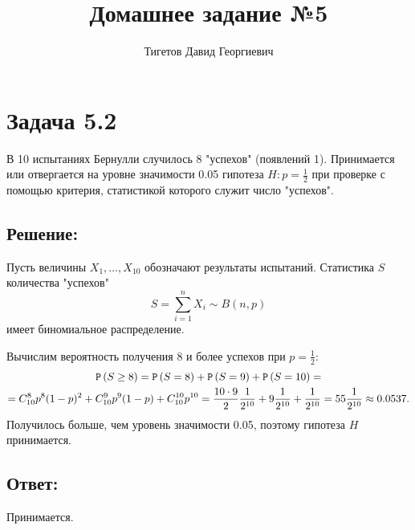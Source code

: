 \documentclass[12pt]{article}
\begin{document}
    \title{Домашнее задание №5}
    \author{Тигетов Давид Георгиевич}
    \date{}
    \maketitle

    \section*{Задача 5.2}
    В 10 испытаниях Бернулли случилось 8 "успехов"{} (появлений 1). Принимается или отвергается на уровне значимости 0.05 гипотеза $H: p = \frac{1}{2}$ при проверке с помощью критерия,
    статистикой которого служит число "успехов".

    \subsection*{Решение:}
    Пусть величины $X_1, \dots, X_{10}$ обозначают результаты испытаний. Статистика $S$ количества "успехов"
    \[
        S = \sum_{i=1}^n X_i \sim B(n,p)
    \]
    имеет биномиальное распределение.

    Вычислим вероятность получения 8 и более успехов при $p = \frac{1}{2}$:
    \begin{multline*}
        \mathtt{P} \left ( S \ge 8 \right )
        = \mathtt{P} \left ( S = 8 \right ) + \mathtt{P} \left ( S = 9 \right ) + \mathtt{P} \left ( S = 10 \right ) = \\
        = C_{10}^8 p^8 (1-p)^2 + C_{10}^9 p^9 (1-p) + C_{10}^{10} p^{10}
        = \frac{10 \cdot 9}{2} \frac{1}{2^{10}} + 9 \frac{1}{2^{10}} + \frac{1}{2^{10}}
        = 55 \frac{1}{2^{10}}
        \approx 0.0537 .
    \end{multline*}
    Получилось больше, чем уровень значимости 0.05, поэтому гипотеза $H$ принимается.

    \subsection*{Ответ:}
    Принимается.
\end{document}
